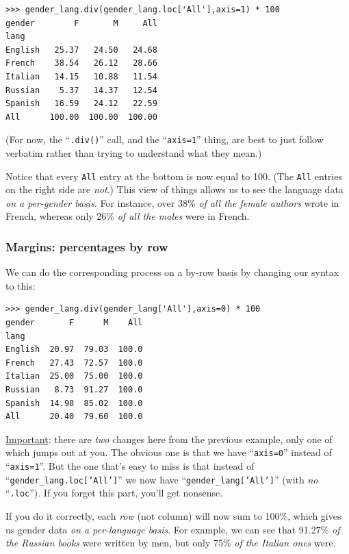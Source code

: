 \begin{Verbatim}[fontsize=\scriptsize,samepage=true,frame=single]
>>> gender_lang.div(gender_lang.loc['All'],axis=1) * 100
gender        F       M     All
lang                           
English   25.37   24.50   24.68
French    38.54   26.12   28.66
Italian   14.15   10.88   11.54
Russian    5.37   14.37   12.54
Spanish   16.59   24.12   22.59
All      100.00  100.00  100.00
\end{Verbatim}

(For now, the ``\texttt{.div()}'' call, and the ``\texttt{axis=1}'' thing, are
best to just follow verbatim rather than trying to understand what they mean.)

Notice that every \texttt{All} entry at the bottom is now equal to 100.
(The \texttt{All} entries on the right side are \textit{not}.) This view of
things allows us to see the language data \textit{on a per-gender basis}. For
instance, over 38\% \textit{of all the female authors} wrote in French, whereas
only 26\% \textit{of all the males} were in French.

\subsubsection{Margins: percentages by row}

We can do the corresponding process on a by-row basis by changing our syntax to
this:

\begin{Verbatim}[fontsize=\scriptsize,samepage=true,frame=single]
>>> gender_lang.div(gender_lang['All'],axis=0) * 100
gender       F      M    All
lang                        
English  20.97  79.03  100.0
French   27.43  72.57  100.0
Italian  25.00  75.00  100.0
Russian   8.73  91.27  100.0
Spanish  14.98  85.02  100.0
All      20.40  79.60  100.0
\end{Verbatim}

\underline{Important}: there are \textit{two} changes here from the previous
example, only one of which jumps out at you. The obvious one is that we have
``\texttt{axis=0}'' instead of ``\texttt{axis=1}''. But the one that's easy to
miss is that instead of ``\texttt{gender\_lang.loc['All']}'' we now have
``\texttt{gender\_lang['All']}'' (with \textit{no} ``\texttt{.loc}''). If you
forget this part, you'll get nonsense.

If you do it correctly, each \textit{row} (not column) will now sum to 100\%,
which gives us gender data \textit{on a per-language basis}. For example,
we can see that 91.27\% \textit{of the Russian books} were written by
men, but only 75\% \textit{of the Italian ones} were.

